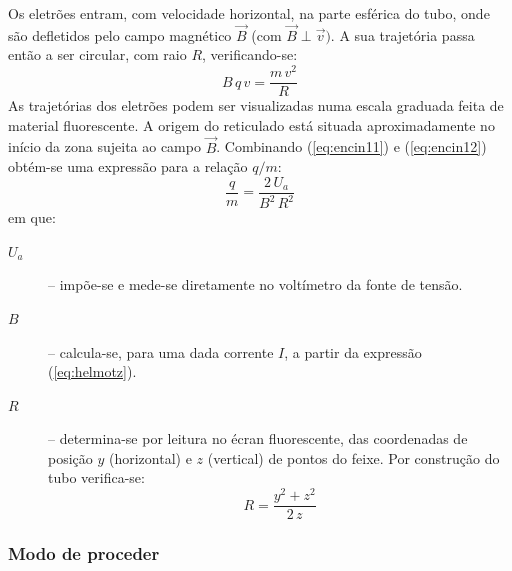 \documentclass[12pt,a4paper,oneside]{paper}
\begin{document}
Os eletrões entram, com velocidade horizontal, na parte esférica do tubo, onde são defletidos pelo campo magnético
$\vec{B}$ (com $\vec{B}\perp\vec{v})$. A sua trajetória passa então a ser circular, com raio $R$, verificando-se:
\begin{equation}
	\label{eq:encin12}
B \, q\, v = \frac{m\,v^2}{R} 
\end{equation}
As trajetórias dos eletrões podem ser visualizadas numa escala graduada feita de material fluorescente. 
A origem do reticulado está situada aproximadamente no início da zona 
sujeita ao campo $\vec{B}$.
Combinando (\ref{eq:encin11}) e (\ref{eq:encin12}) obtém-se uma expressão para a relação $q/m$:
\begin{equation}
	\label{eq:encin3}
 \frac{q}{m} = \frac{2\, U_a}{B^2\,R^2} 
\end{equation}
em que:
\begin{description}
\item[$U_a$] – impõe-se e mede-se diretamente no voltímetro da fonte de tensão.
\item[$B$] – calcula-se, para uma dada corrente $I$, a partir da expressão (\ref{eq:helmotz}).
\item[$R$] – determina-se por leitura no écran fluorescente, das coordenadas de posição $y$ (horizontal) e $z$ (vertical)
de pontos do feixe. Por construção do tubo verifica-se:
\begin{equation}
	\label{eq:eR}
 R = \frac{y^2 + z^2}{2 \, z} 
\end{equation}
\end{description}



\subsubsection{\sf Modo de proceder}
\end{document}
